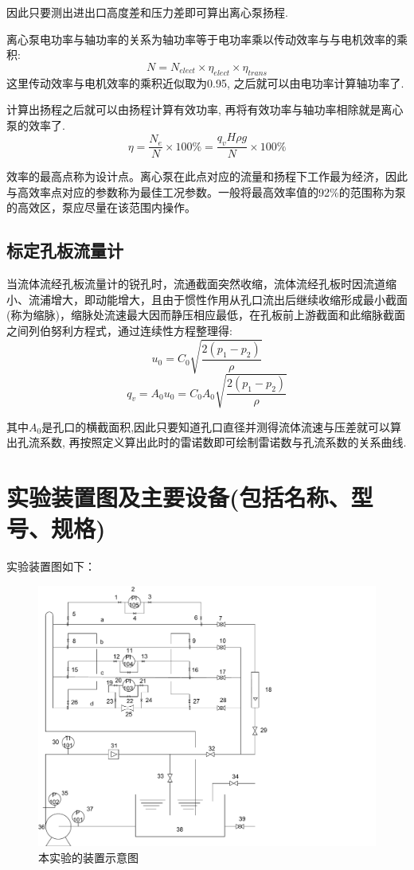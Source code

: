 \documentclass[a4paper,UTF8]{ctexrep}
\theoremstyle{plain}
\theoremstyle{definition}
\numberwithin{equation}{chapter}
\begin{document}
因此只要测出进出口高度差和压力差即可算出离心泵扬程.

离心泵电功率与轴功率的关系为轴功率等于电功率乘以传动效率与与电机效率的乘积:
\begin{equation}
    N=N_{elect} \times \eta_{elect} \times \eta_{trans}
\end{equation}
这里传动效率与电机效率的乘积近似取为0.95, 之后就可以由电功率计算轴功率了.

计算出扬程之后就可以由扬程计算有效功率, 再将有效功率与轴功率相除就是离心泵的效率了.
\begin{equation}
    \eta =\frac{N_e}{N}\times 100\%= \frac{q_v H \rho g}{N}\times 100\%
\end{equation}

效率的最高点称为设计点。离心泵在此点对应的流量和扬程下工作最为经济，因此与高效率点对应的参数称为最佳工况参数。一般将最高效率值的92\%的范围称为泵的高效区，泵应尽量在该范围内操作。

\subsection{标定孔板流量计}
当流体流经孔板流量计的锐孔时，流通截面突然收缩，流体流经孔板时因流道缩小、流浦增大，即动能增大，且由于惯性作用从孔口流出后继续收缩形成最小截面(称为缩脉)，缩脉处流速最大因而静压相应最低，在孔板前上游截面和此缩脉截面之间列伯努利方程式，通过连续性方程整理得:
\begin{equation}
    u_0=C_0\sqrt{\frac{2(p_1-p_2)}{\rho}}
\end{equation}
\begin{equation}
    q_v=A_0u_0=C_0A_0\sqrt{\frac{2(p_1-p_2)}{\rho}}
\end{equation}

其中$A_0$是孔口的横截面积,因此只要知道孔口直径并测得流体流速与压差就可以算出孔流系数, 再按照定义算出此时的雷诺数即可绘制雷诺数与孔流系数的关系曲线. 




        \section{实验装置图及主要设备(包括名称、型号、规格)}
实验装置图如下：


\begin{figure}[h]
    \centering
    \includegraphics[width=0.7\linewidth]{流体力学实验装置示意图.pdf}
    \caption{本实验的装置示意图}
    \label{fig:enter-label}
\end{figure}
\end{document}

